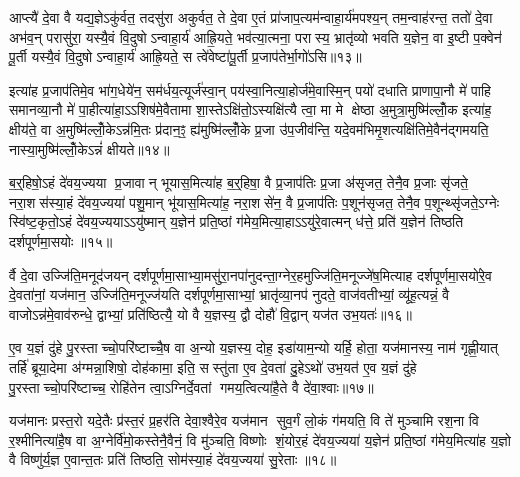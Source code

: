 आप्त्यै॑ दे॒वा वै यद्य॒ज्ञेऽकु॑र्वत॒ तदसु॑रा अकुर्वत॒ ते दे॒वा ए॒तं प्रा॑जाप॒त्यम॑न्वाहा॒र्य॑मपश्य॒न् तम॒न्वाह॑रन्त॒ ततो॑ दे॒वा अभ॑व॒न् परासु॑रा॒ यस्यै॒वं वि॒दुषोऽन्वाहा॒र्य॑ आह्रि॒यते॒ भव॑त्या॒त्मना॒ परास्य॒ भ्रातृ॑व्यो भवति य॒ज्ञेन॒ वा इ॒ष्टी प॒क्वेन॑ पू॒र्ती यस्यै॒वं वि॒दुषोऽन्वाहा॒र्य॑ आह्रि॒यते॒ स त्वे॑वेष्टा॑पू॒र्ती प्र॒जाप॑तेर्भा॒गो॑ऽसि॥१३॥

इत्या॑ह प्र॒जाप॑तिमे॒व भा॑ग॒धेये॑न॒ सम॑र्धय॒त्यूर्ज॑स्वा॒न् पय॑स्वा॒नित्या॒होर्ज॑मे॒वास्मि॒न् पयो॑ दधाति प्राणापा॒नौ मे॑ पाहि समानव्या॒नौ मे॑ पा॒हीत्या॑हा॒ऽऽशिष॑मे॒वैतामा शा॒स्तेऽक्षि॑तो॒ऽस्यक्षि॑त्यै त्वा॒ मा मे क्षेष्ठा अ॒मुत्रा॒मुष्मि॑ल्लोँ॒क इत्या॑ह॒ क्षीय॑ते॒ वा अ॒मुष्मि॑ल्लोँ॒केऽन्न॑मि॒तः प्र॑दान॒ꣵ॒ ह्य॑मुष्मि॑ल्लोँ॒के प्र॒जा उ॑प॒जीव॑न्ति॒ यदे॒वम॑भिमृ॒शत्यक्षि॑तिमे॒वैन॑द्गमयति॒ नास्या॒मुष्मि॑ल्लोँ॒केऽन्नं॑ क्षीयते॥१४॥

{\anuvakamend[{अ॒न्वा॒हा॒र्ये॑ण प्र॒जाप॑तेरसि॒ ह्य॑मुष्मि॑ल्लोँ॒के पञ्च॑दश च॥३॥}]}

ब॒र्॒\mbox{}हिषो॒ऽहं दे॑वय॒ज्यया प्र॒जावान् भूयास॒मित्या॑ह ब॒र्॒\mbox{}हिषा॒ वै प्र॒जाप॑तिः प्र॒जा अ॑सृजत॒ तेनै॒व प्र॒जाः सृ॑जते॒ नरा॒शस॑स्या॒हं दे॑वय॒ज्यया॑ पशु॒मान् भू॑यास॒मित्या॑ह॒ नरा॒शसे॑न॒ वै प्र॒जाप॑तिः प॒शून॑सृजत॒ तेनै॒व प॒शून्थ्सृ॑जते॒ऽग्नेः स्वि॑ष्ट॒कृतो॒ऽहं दे॑वय॒ज्ययाऽऽयु॑ष्मान् य॒ज्ञेन॑ प्रति॒ष्ठां ग॑मेय॒मित्या॒हाऽऽयु॑रे॒वात्मन् ध॑त्ते॒ प्रति॑ य॒ज्ञेन॑ तिष्ठति दर्\mbox{}शपूर्णमा॒सयोः॥१५॥

र्वै दे॒वा उज्जि॑ति॒मनूद॑जयन् दर्\mbox{}शपूर्णमा॒साभ्या॒मसु॑रा॒नपा॑नुदन्ता॒ग्नेर॒हमुज्जि॑ति॒मनूज्जे॑ष॒मित्याह दर्\mbox{}शपूर्णमा॒सयो॑रे॒व दे॒वता॑नां॒ यज॑मान॒ उज्जि॑ति॒मनूज्ज॑यति दर्\mbox{}शपूर्णमा॒साभ्यां॒ भ्रातृ॑व्या॒नप॑ नुदते॒ वाज॑वतीभ्यां॒ व्यू॑ह॒त्यन्नं॒ वै वाजोऽन्न॑मे॒वाव॑रुन्धे॒ द्वाभ्यां॒ प्रति॑ष्ठित्यै॒ यो वै य॒ज्ञस्य॒ द्वौ दोहौ॑ वि॒द्वान् यज॑त उभ॒यतः॑॥१६॥

ए॒व य॒ज्ञं दु॑हे पु॒रस्ताच्चो॒परि॑ष्टाच्चै॒ष वा अ॒न्यो य॒ज्ञस्य॒ दोह॒ इडा॑याम॒न्यो यर्\mbox{}हि॒ होता॒ यज॑मानस्य॒ नाम॑ गृह्णी॒यात् तर्\mbox{}हि॑ ब्रूया॒देमा अ॑ग्मन्ना॒शिषो॒ दोह॑कामा॒ इति॒ सस्तु॑ता ए॒व दे॒वता॑ दु॒हेऽथो॑ उभ॒यत॑ ए॒व य॒ज्ञं दु॑हे पु॒रस्ताच्चो॒परि॑ष्टाच्च॒ रोहि॑तेन त्वा॒ऽग्निर्दे॒वतां गमय॒त्वित्या॑है॒ते वै दे॑वा॒श्वाः॥१७॥

यज॑मानः प्रस्त॒रो यदे॒तैः प्र॑स्त॒रं प्र॒हर॑ति देवा॒श्वैरे॒व यज॑मान सुव॒र्गं लो॒कं ग॑मयति॒ वि ते॑ मुञ्चामि रश॒ना वि र॒श्मीनित्या॑है॒ष वा अ॒ग्नेर्वि॑मो॒कस्तेनै॒वैनं॒ वि मु॑ञ्चति॒ विष्णोः शं॒योर॒हं दे॑वय॒ज्यया॑ य॒ज्ञेन॑ प्रति॒ष्ठां ग॑मेय॒मित्या॑ह य॒ज्ञो वै विष्णु॑र्य॒ज्ञ ए॒वान्त॒तः प्रति॑ तिष्ठति॒ सोम॑स्या॒हं दे॑वय॒ज्यया॑ सु॒रेताः॥१८॥

